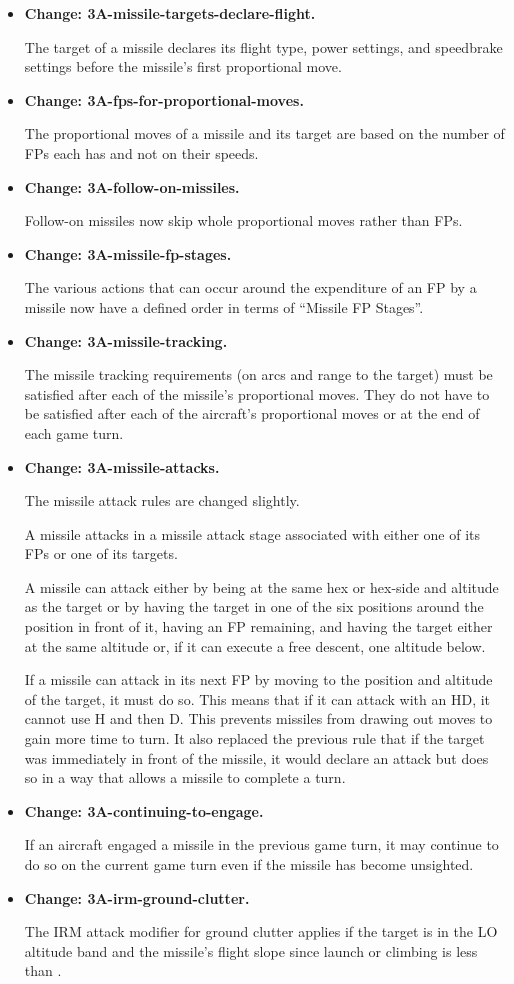 \documentclass[10pt]{report}
\newcommand{\itemtag}[1]{\item \textbf{Change: #1.}\par}
\begin{document}
\begin{itemize}
    \itemtag{3A-missile-targets-declare-flight} The target of a missile declares its flight type, power settings, and speedbrake settings before the missile's first proportional move.
    
    \itemtag{3A-fps-for-proportional-moves} The proportional moves of a missile and its target are based on the number of FPs each has and not on their speeds.
    
    \itemtag{3A-follow-on-missiles} Follow-on missiles now skip whole proportional moves rather than FPs.
    
    \itemtag{3A-missile-fp-stages} The various actions that can occur around the expenditure of an FP by a missile now have a defined order in terms of “Missile FP Stages”.
    
    \itemtag{3A-missile-tracking} The missile tracking requirements (on arcs and range to the target) must be satisfied after each of the missile's proportional moves. They do not have to be satisfied after each of the aircraft's proportional moves or at the end of each game turn.
    
    \itemtag{3A-missile-attacks} The missile attack rules are changed slightly. 
    
    A missile attacks in a missile attack stage associated with either one of its FPs or one of its targets. 
    
    A missile can attack either by being at the same hex or hex-side and altitude as the target or by having the target in one of the six positions around the position in front of it, having an FP remaining, and having the target either at the same altitude or, if it can execute a free descent, one altitude below.

    If a missile can attack in its next FP by moving to the position and altitude of the target, it must do so. This means that if it can attack with an HD, it cannot use H and then D. This prevents missiles from drawing out moves to gain more time to turn. It also replaced the previous rule that if the target was immediately in front of the missile, it would declare an attack but does so in a way that allows a missile to complete a turn.

    \itemtag{3A-continuing-to-engage} If an aircraft engaged a missile in the previous game turn, it may continue to do so on the current game turn even if the missile has become unsighted.
    
    \itemtag{3A-irm-ground-clutter} The IRM attack modifier for ground clutter applies if the target is in the LO altitude band and the missile's flight slope since launch or climbing is less than .
    

\end{itemize}
\end{document}
